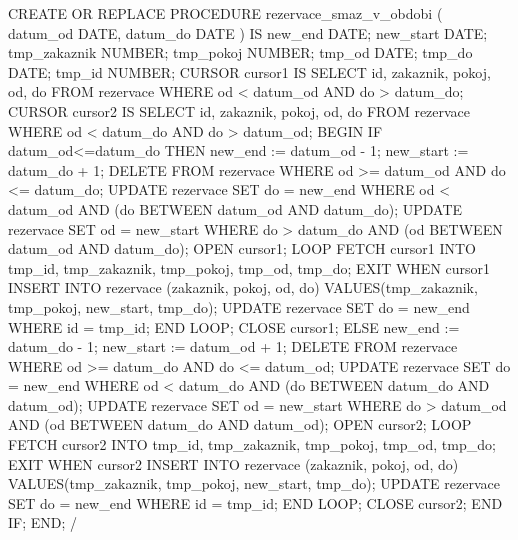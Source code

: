 \documentclass[11pt,a4paper]{article}
\begin{document}

\begin{boxedverbatim}
CREATE OR REPLACE PROCEDURE rezervace_smaz_v_obdobi (
  datum_od DATE, datum_do DATE ) IS
new_end DATE;
new_start DATE;
tmp_zakaznik NUMBER;
tmp_pokoj NUMBER;
tmp_od DATE;
tmp_do DATE;
tmp_id NUMBER;
CURSOR cursor1 IS
        SELECT id, zakaznik, pokoj, od, do
        FROM rezervace WHERE od < datum_od AND do > datum_do;
CURSOR cursor2 IS
        SELECT id, zakaznik, pokoj, od, do
        FROM rezervace WHERE od < datum_do AND do > datum_od;
BEGIN
IF datum_od<=datum_do THEN
    new_end := datum_od - 1;
    new_start := datum_do + 1;
    DELETE FROM rezervace WHERE od >= datum_od AND do <= datum_do;
    UPDATE rezervace SET do = new_end
        WHERE od < datum_od AND (do BETWEEN datum_od AND datum_do);
    UPDATE rezervace SET od = new_start
        WHERE do > datum_do AND (od BETWEEN datum_od AND datum_do);
    OPEN cursor1;
    LOOP
        FETCH cursor1        INTO tmp_id, tmp_zakaznik, tmp_pokoj, tmp_od, tmp_do;
        EXIT WHEN cursor1%
        INSERT INTO rezervace (zakaznik, pokoj, od, do)
            VALUES(tmp_zakaznik, tmp_pokoj, new_start, tmp_do);
        UPDATE rezervace
            SET do = new_end WHERE id = tmp_id;
    END LOOP;
    CLOSE cursor1;
ELSE
    new_end := datum_do - 1;
    new_start := datum_od + 1;        
    DELETE FROM rezervace WHERE od >= datum_do AND do <= datum_od;
    UPDATE rezervace SET do = new_end
        WHERE od < datum_do AND (do BETWEEN datum_do AND datum_od);
    UPDATE rezervace SET od = new_start
        WHERE do > datum_od AND (od BETWEEN datum_do AND datum_od);
    OPEN cursor2;
    LOOP
        FETCH cursor2         INTO tmp_id, tmp_zakaznik, tmp_pokoj, tmp_od, tmp_do;
        EXIT WHEN cursor2%
        INSERT INTO rezervace (zakaznik, pokoj, od, do)
            VALUES(tmp_zakaznik, tmp_pokoj, new_start, tmp_do);
        UPDATE rezervace SET do = new_end WHERE id = tmp_id;
    END LOOP;
    CLOSE cursor2;
END IF;
END;
/
\end{boxedverbatim}
\end{document}
